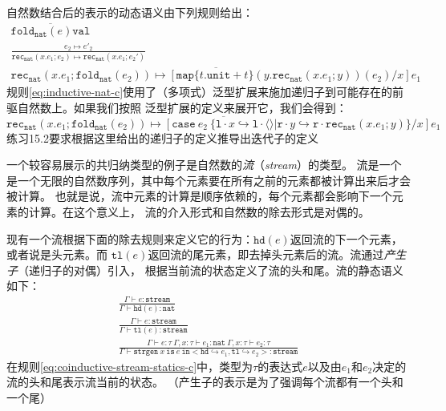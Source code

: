 自然数结合后的表示的动态语义由下列规则给出：
\begin{subequations}\label{eq:inductive-nat}
	\begin{gather}
	\overline{\texttt{fold}_\texttt{nat}(e)\texttt{val}} \label{eq:inductive-nat-a}\\
	\frac{e_2\mapsto e'_2}{\texttt{rec}_\texttt{nat}(x.e_1;e_2)\mapsto\texttt{rec}_\texttt{nat}(x.e_1;e_2')} \label{eq:inductive-nat-b}\\
	\overline{\texttt{rec}_\texttt{nat}(x.e_1;\texttt{fold}_\texttt{nat}(e_2)) \mapsto
		[\texttt{map}\{t.\texttt{unit} +t\}(y.\texttt{rec}_\texttt{nat}(x.e_1;y))(e_2)/x]e_1}\label{eq:inductive-nat-c}
	\end{gather}
\end{subequations}
规则\ref{eq:inductive-nat-c}使用了（多项式）泛型扩展来施加递归子到可能存在的前驱自然数上。如果我们按照
泛型扩展的定义来展开它，我们会得到：
$$\overline{\texttt{rec}_\texttt{nat}(x.e_1;\texttt{fold}_\texttt{nat}(e_2)) \mapsto
[\texttt{case}\ e_2\ \{\texttt{l}\cdot x\hookrightarrow\texttt{l}\cdot\langle\rangle|
\texttt{r}\cdot y\hookrightarrow\texttt{r}\cdot\texttt{rec}_\texttt{nat}(x.e_1;y)\}/x]e_1}$$
练习15.2要求根据这里给出的递归子的定义推导出迭代子的定义

一个较容易展示的共归纳类型的例子是自然数的\textit{流}（\textit{stream}）的类型。
流是一个是一个无限的自然数序列，其中每个元素要在所有之前的元素都被计算出来后才会被计算。
也就是说，流中元素的计算是顺序依赖的，每个元素都会影响下一个元素的计算。在这个意义上，
流的介入形式和自然数的除去形式是对偶的。

现有一个流根据下面的除去规则来定义它的行为：$\texttt{hd}(e)$返回流的下一个元素，或者说是头元素。而
$\texttt{tl}(e)$返回流的尾元素，即去掉头元素后的流。流通过\textit{产生子}（递归子的对偶）引入，
根据当前流的状态定义了流的头和尾。流的静态语义如下：
\begin{subequations} \label{eq:coinductive-stream-statics}
	\begin{gather}
	\frac{\Gamma\vdash e:\texttt{stream}}{\Gamma\vdash\texttt{hd}(e):\texttt{nat}} \label{eq:coinductive-stream-statics-a}\\
	\frac{\Gamma\vdash e:\texttt{stream}}{\Gamma\vdash\texttt{tl}(e):\texttt{stream}} \label{eq:coinductive-stream-statics-b}\\
	\frac{\Gamma\vdash e:\tau\ \Gamma,x:\tau\vdash e_1:\texttt{nat}\ \Gamma,x:\tau\vdash e_2:\tau}
	{\Gamma\vdash\texttt{strgen}\ x\ \texttt{is}\ e\ \texttt{in} <\texttt{hd}\hookrightarrow e_1,
		\texttt{tl}\hookrightarrow e_2>:\texttt{stream}}\label{eq:coinductive-stream-statics-c}
	\end{gather}
\end{subequations}
在规则\ref{eq:coinductive-stream-statics-c}中，类型为$\tau$的表达式$e$以及由$e_1$和$e_2$决定的流的头和尾表示流当前的状态。
（产生子的表示是为了强调每个流都有一个头和一个尾）

